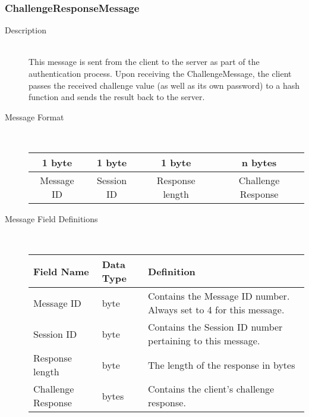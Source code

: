 \documentclass[12pt,letterpaper,titlepage]{article}
\begin{document}
\subsubsection{ChallengeResponseMessage}
	\begin{description}
	\item[Description] \hfill \\
		This message is sent from the client to the server as part of the authentication process.  
		Upon receiving the ChallengeMessage, the client passes the received challenge value 
		(as well as its own password) to a hash function and sends the result back to the server.
	\item[Message Format] \hfill \\
	\begin{tabular}{ | c | c | c | c | }
		\hline
		1 byte & 1 byte & 1 byte & n bytes \\
		\hline
		Message ID & Session ID & Response length &  Challenge Response \\
		\hline
	\end{tabular}
	\item[Message Field Definitions] \hfill \\
	\begin{tabular}{ | p{3cm} | p{1.5cm}  | p{8cm} | }
		\hline
		Field Name & Data Type & Definition \\
		\hline
		Message ID & byte & Contains the Message ID number. 
					\newline Always set to 4 for this message. \\
		\hline
		Session ID & byte & Contains the Session ID number pertaining to this message. \\
		\hline
		Response length & byte & The length of the response in bytes \\
		\hline
		Challenge Response & bytes & Contains the client's challenge response. \\
		\hline
	\end{tabular}
	\end{description}
\end{document}
